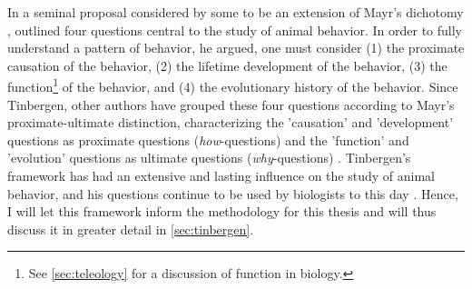 In a seminal proposal considered by some to be an extension of Mayr's dichotomy \citep{Laland13}, \citet{Tinbergen63} outlined four questions central to the study of animal behavior. In order to fully understand a pattern of behavior, he argued, one must consider (1) the proximate causation of the behavior, (2) the lifetime development of the behavior, (3) the function\footnote{See \cref{sec:teleology} for a discussion of function in biology.} of the behavior, and (4) the evolutionary history of the behavior.
Since Tinbergen, other authors have grouped these four questions according to Mayr's proximate-ultimate distinction, characterizing the 'causation' and 'development' questions as proximate questions (\emph{how}-questions) and the 'function' and 'evolution' questions as ultimate questions (\emph{why}-questions) \citep{BatesonLaland13, Laland13}.
Tinbergen's framework has had an extensive and lasting influence on the study of animal behavior, and his questions continue to be used by biologists to this day \citep{BatesonLaland13}. Hence, I will let this framework inform the methodology for this thesis and will thus discuss it in greater detail in \cref{sec:tinbergen}.

